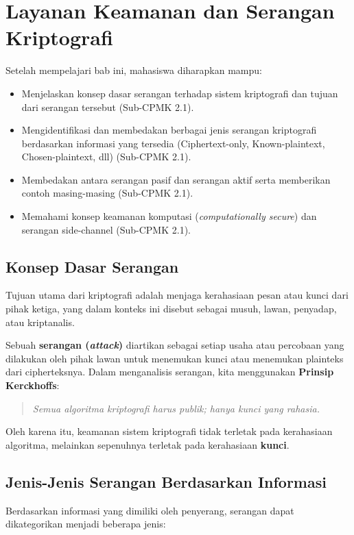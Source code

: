 \documentclass[../main.tex]{subfiles}
\begin{document}
\chapter{Layanan Keamanan dan Serangan Kriptografi}

\begin{learningoutcome}
Setelah mempelajari bab ini, mahasiswa diharapkan mampu:
\begin{itemize}
    \item Menjelaskan konsep dasar serangan terhadap sistem kriptografi dan tujuan dari serangan tersebut (Sub-CPMK 2.1).
    \item Mengidentifikasi dan membedakan berbagai jenis serangan kriptografi berdasarkan informasi yang tersedia (Ciphertext-only, Known-plaintext, Chosen-plaintext, dll) (Sub-CPMK 2.1).
    \item Membedakan antara serangan pasif dan serangan aktif serta memberikan contoh masing-masing (Sub-CPMK 2.1).
    \item Memahami konsep keamanan komputasi (\textit{computationally secure}) dan serangan side-channel (Sub-CPMK 2.1).
\end{itemize}
\end{learningoutcome}

\section{Konsep Dasar Serangan}
Tujuan utama dari kriptografi adalah menjaga kerahasiaan pesan atau kunci dari pihak ketiga, yang dalam konteks ini disebut sebagai musuh, lawan, penyadap, atau kriptanalis.

Sebuah \textbf{serangan (\textit{attack})} diartikan sebagai setiap usaha atau percobaan yang dilakukan oleh pihak lawan untuk menemukan kunci atau menemukan plainteks dari cipherteksnya. Dalam menganalisis serangan, kita menggunakan \textbf{Prinsip Kerckhoffs}:
\begin{quote}
    \textit{Semua algoritma kriptografi harus publik; hanya kunci yang rahasia.}
\end{quote}
Oleh karena itu, keamanan sistem kriptografi tidak terletak pada kerahasiaan algoritma, melainkan sepenuhnya terletak pada kerahasiaan \textbf{kunci}.

\section{Jenis-Jenis Serangan Berdasarkan Informasi}
Berdasarkan informasi yang dimiliki oleh penyerang, serangan dapat dikategorikan menjadi beberapa jenis:
\end{document}
